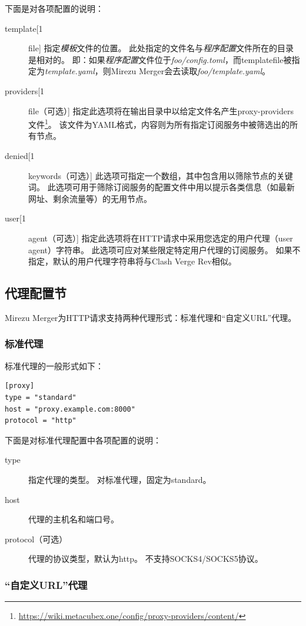 \documentclass[a4paper,fontset=founder,punct=kaiming]{ctexart}
\renewcommand\_{\textunderscore\linebreak[1]}
\newcommand{\productname}{Mirezu Merger}
\begin{document}
下面是对各项配置的说明：
\begin{description}
\item[template\_file] 指定\emph{模板}文件的位置。
  此处指定的文件名与\emph{程序配置}文件所在的目录是相对的。
  即：如果\emph{程序配置}文件位于\emph{foo/config.toml}，而template\_file被指定为\emph{template.yaml}，则\productname 会去读取\emph{foo/template.yaml}。
\item[providers\_file（可选）] 指定此选项将在输出目录中以给定文件名产生proxy-providers文件\footnote{\url{https://wiki.metacubex.one/config/proxy-providers/content/}}。
  该文件为YAML格式，内容则为所有指定订阅服务中被筛选出的所有节点。
\item[denied\_keywords（可选）] 此选项可指定一个数组，其中包含用以筛除节点的关键词。
  此选项可用于筛除订阅服务的配置文件中用以提示各类信息（如最新网址、剩余流量等）的无用节点。
\item[user\_agent（可选）] 指定此选项将在HTTP请求中采用您选定的用户代理（user agent）字符串。
  此选项可应对某些限定特定用户代理的订阅服务。
  如果不指定，默认的用户代理字符串将与Clash Verge Rev相似。
\end{description}

\subsection{代理配置节}
\label{sec:proxyconf}

\productname 为HTTP请求支持两种代理形式：标准代理和“自定义URL”代理。

\subsubsection{标准代理}
\label{sec:stdproxy}

标准代理的一般形式如下：
\begin{Verbatim}
[proxy]
type = "standard"
host = "proxy.example.com:8000"
protocol = "http"
\end{Verbatim}

下面是对标准代理配置中各项配置的说明：
\begin{description}
\item[type] 指定代理的类型。
  对标准代理，固定为standard。
\item[host] 代理的主机名和端口号。
\item[protocol（可选）] 代理的协议类型，默认为http。
  不支持SOCKS4/SOCKS5协议。
\end{description}

\subsubsection{“自定义URL”代理}
\label{sec:urlproxy}
\end{document}

